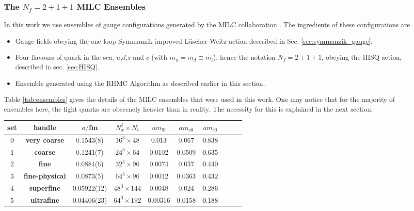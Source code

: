 \subsubsection{The $N_f=2+1+1$ MILC Ensembles}
\label{sec:MILCensembles}

In this work we use ensembles of gauge configurations generated by the MILC collaboration \cite{Bazavov:2012xda,Bazavov:2010ru}. The ingredients of these configurations are
\begin{itemize}
\item
  Gauge fields obeying the one-loop Symmanzik improved L\"uscher-Weitz action described in Sec. \ref{sec:symmanzik_gauge}.
\item
  Four flavours of quark in the sea, $u$,$d$,$s$ and $c$ (with $m_u=m_d\equiv m_l$), hence the notation $N_f=2+1+1$, obeying the HISQ action, described in sec. \ref{sec:HISQ}.
\item
  Ensemble generated using the RHMC Algorithm as described earlier in this section.
\end{itemize}
Table \ref{tab:ensembles} gives the details of the MILC ensembles that were used in this work. One may notice that for the majority of ensembles here, the light quarks are obscenely heavier than in reality. The necessity for this is explained in the next section.

\begin{table*}[t]
  \begin{center}
    \begin{tabular}{c c c c c c c c c c}
      \hline
      set & handle & $a/$fm  & $N_x^3\times N_t$ & $am_{l0}$ & $am_{s0}$ & $am_{c0}$  \\ [0.5ex]
      \hline
      0 & \bf{very coarse} & 0.1543(8) & $16^3\times48$ & 0.013 & 0.067 & 0.838 \\ [1ex]
      1 & \bf{coarse} & 0.1241(7) & $24^3\times64$ & 0.0102 & 0.0509 & 0.635 \\ [1ex]
      2 & \bf{fine} & 0.0884(6) & $32^3\times96$ & 0.0074 & 0.037 & 0.440 \\ [1ex]
      3 & \bf{fine-physical} & 0.0873(5) & $64^3\times96$ & 0.0012 & 0.0363 & 0.432 \\ [1ex]
      4 & \bf{superfine} & 0.05922(12) & $48^3\times144$ & 0.0048 & 0.024 & 0.286 \\ [1ex]
      5 & \bf{ultrafine} & 0.04406(23) &  $64^3\times192$ & 0.00316 & 0.0158 & 0.188  \\ [1ex]
      \hline
    \end{tabular}
  \end{center}
  \caption{Parameters for gluon ensembles \cite{Bazavov:2010ru,Bazavov:2012xda}. $a$ values for sets 0-3 were deduced in \cite{Dowdall:2013rya}, set 4 from \cite{Chakraborty:2014aca}. We thank C. McNeile for computing the $a$ value on set 5. These $a$ values are determined by measuring the Wilson flow parameter $w_0/a$ on the lattice, then using the known value for $w_0$ to isolate $a$. Columns 5-7 give the masses used in the action for light,strange and charm quarks in the sea. \label{tab:ensembles}}
\end{table*}


